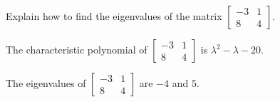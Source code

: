 
\begin{exerciseStatement}


Explain how to find the eigenvalues of the matrix \( \left[\begin{array}{cc}
-3 & 1 \\
8 & 4
\end{array}\right] \).


\end{exerciseStatement}
    
\begin{exerciseAnswer} 


The characteristic polynomial of \( \left[\begin{array}{cc}
-3 & 1 \\
8 & 4
\end{array}\right] \) is \( \lambda^{2} - \lambda - 20 \).



The eigenvalues of \( \left[\begin{array}{cc}
-3 & 1 \\
8 & 4
\end{array}\right] \) are \( -4 \) and \( 5 \).


\end{exerciseAnswer}
    
